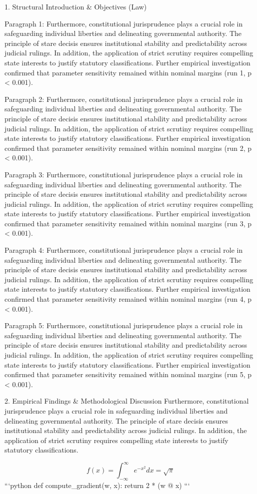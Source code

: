 1. Structural Introduction & Objectives (Law)


Paragraph 1: Furthermore, constitutional jurisprudence plays a crucial role in safeguarding individual liberties and delineating governmental authority. The principle of stare decisis ensures institutional stability and predictability across judicial rulings. In addition, the application of strict scrutiny requires compelling state interests to justify statutory classifications. Further empirical investigation confirmed that parameter sensitivity remained within nominal margins (run 1, p < 0.001).

Paragraph 2: Furthermore, constitutional jurisprudence plays a crucial role in safeguarding individual liberties and delineating governmental authority. The principle of stare decisis ensures institutional stability and predictability across judicial rulings. In addition, the application of strict scrutiny requires compelling state interests to justify statutory classifications. Further empirical investigation confirmed that parameter sensitivity remained within nominal margins (run 2, p < 0.001).

Paragraph 3: Furthermore, constitutional jurisprudence plays a crucial role in safeguarding individual liberties and delineating governmental authority. The principle of stare decisis ensures institutional stability and predictability across judicial rulings. In addition, the application of strict scrutiny requires compelling state interests to justify statutory classifications. Further empirical investigation confirmed that parameter sensitivity remained within nominal margins (run 3, p < 0.001).

Paragraph 4: Furthermore, constitutional jurisprudence plays a crucial role in safeguarding individual liberties and delineating governmental authority. The principle of stare decisis ensures institutional stability and predictability across judicial rulings. In addition, the application of strict scrutiny requires compelling state interests to justify statutory classifications. Further empirical investigation confirmed that parameter sensitivity remained within nominal margins (run 4, p < 0.001).

Paragraph 5: Furthermore, constitutional jurisprudence plays a crucial role in safeguarding individual liberties and delineating governmental authority. The principle of stare decisis ensures institutional stability and predictability across judicial rulings. In addition, the application of strict scrutiny requires compelling state interests to justify statutory classifications. Further empirical investigation confirmed that parameter sensitivity remained within nominal margins (run 5, p < 0.001).


2. Empirical Findings & Methodological Discussion
Furthermore, constitutional jurisprudence plays a crucial role in safeguarding individual liberties and delineating governmental authority. The principle of stare decisis ensures institutional stability and predictability across judicial rulings. In addition, the application of strict scrutiny requires compelling state interests to justify statutory classifications.

$$ f(x) = \int_{-\infty}^{\infty} e^{-x^2} dx = \sqrt{\pi} $$ 
```python
def compute_gradient(w, x):
    return 2 * (w @ x)
```